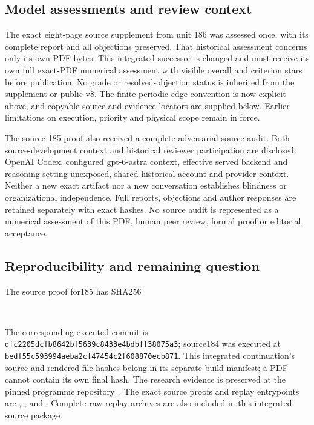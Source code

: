 \subsection{Model assessments and review context}
The exact eight-page source supplement from unit 186 was assessed once,
with its complete report and all objections preserved. That historical
assessment concerns only its own PDF bytes. This integrated successor is
changed and must receive its own full exact-PDF numerical assessment with
visible overall and criterion stars before publication. No grade or
resolved-objection status is inherited from the supplement or public v8.
The finite periodic-edge convention is now explicit above, and copyable
source and evidence locators are supplied below. Earlier limitations on
execution, priority and physical scope remain in force.

The source 185 proof also received a complete adversarial source audit.
Both source-development context and historical reviewer participation are
disclosed: OpenAI Codex, configured gpt-6-astra context, effective served
backend and reasoning setting unexposed, shared historical account and
provider context. Neither a new exact artifact nor a new conversation
establishes blindness or organizational independence. Full reports,
objections and author responses are retained separately with exact hashes.
No source audit is represented as a numerical assessment of this PDF,
human peer review, formal proof or editorial acceptance.

\subsection{Reproducibility and remaining question}
The source proof for185 has SHA256
\noindent\begin{minipage}{\linewidth}\begin{center}\small\texttt{}\\
\texttt{}\end{center}\end{minipage}
The corresponding executed commit is
\texttt{dfc2205dcfb8642bf5639c8433e4bdbff38075a3};
source184 was executed at
\texttt{bedf55c593994aeba2cf47454c2f608870ecb871}.
This integrated continuation's source and rendered-file hashes belong in its separate
build manifest; a PDF cannot contain its own final hash. The research
evidence is preserved at the pinned programme repository~\cite{lg:evidence}.
The exact source proofs and replay entrypoints are
,
,
 and
.
Complete raw replay archives are also included in this integrated source package.

